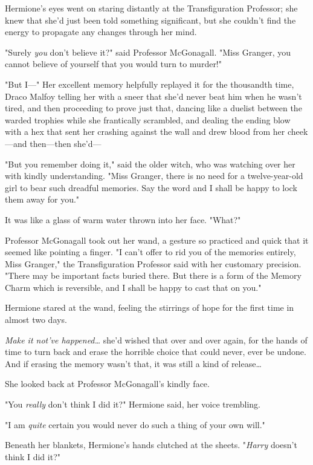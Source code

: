 Hermione's eyes went on staring distantly at the Transfiguration Professor; she
knew that she'd just been told something significant, but she couldn't find the
energy to propagate any changes through her mind.

"Surely \emph{you} don't believe it?" said Professor McGonagall. "Miss Granger,
you cannot believe of yourself that you would turn to murder!"

"But I---" Her excellent memory helpfully replayed it for the thousandth time,
Draco Malfoy telling her with a sneer that she'd never beat him when he wasn't
tired, and then proceeding to prove just that, dancing like a duelist between
the warded trophies while she frantically scrambled, and dealing the ending
blow with a hex that sent her crashing against the wall and drew blood from her
cheek---and then---then she'd---

"But you remember doing it," said the older witch, who was watching over her
with kindly understanding. "Miss Granger, there is no need for a
twelve-year-old girl to bear such dreadful memories. Say the word and I shall
be happy to lock them away for you."

It was like a glass of warm water thrown into her face. "What?"

Professor McGonagall took out her wand, a gesture so practiced and quick that
it seemed like pointing a finger. "I can't offer to rid you of the memories
entirely, Miss Granger," the Transfiguration Professor said with her customary
precision. "There may be important facts buried there. But there is a form of
the Memory Charm which is reversible, and I shall be happy to cast that on you."

Hermione stared at the wand, feeling the stirrings of hope for the first time
in almost two days.

\emph{Make it not've happened{\ldots}} she'd wished that over and over again, for
the hands of time to turn back and erase the horrible choice that could never,
ever be undone. And if erasing the memory wasn't that, it was still a kind of
release{\ldots}

She looked back at Professor McGonagall's kindly face.

"You \emph{really} don't think I did it?" Hermione said, her voice trembling.

"I am \emph{quite} certain you would never do such a thing of your own will."

Beneath her blankets, Hermione's hands clutched at the sheets. "\emph{Harry}
doesn't think I did it?"

